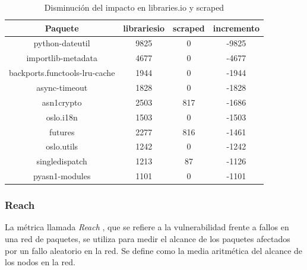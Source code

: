 \begin{table}[h!]
    \centering
    \label{tab:Disminución del impacto en libraries.io y scraped}
    \begin{tabular}{|c|c|c|c|}
        \hline
        \textbf{Paquete}              & \textbf{librariesio} & \textbf{scraped} & \textbf{incremento} \\
        \hline
        python-dateutil               & 9825                 & 0                & -9825               \\
        importlib-metadata            & 4677                 & 0                & -4677               \\
        backports.functools-lru-cache & 1944                 & 0                & -1944               \\
        async-timeout                 & 1828                 & 0                & -1828               \\
        asn1crypto                    & 2503                 & 817              & -1686               \\
        oslo.i18n                     & 1503                 & 0                & -1503               \\
        futures                       & 2277                 & 816              & -1461               \\
        oslo.utils                    & 1242                 & 0                & -1242               \\
        singledispatch                & 1213                 & 87               & -1126               \\
        pyasn1-modules                & 1101                 & 0                & -1101               \\
        \hline
    \end{tabular}
    \caption{Disminución del impacto en libraries.io y scraped}
\end{table}




\subsubsection{Reach}

La métrica llamada \emph{Reach} , que se refiere a la vulnerabilidad
frente a fallos en una red de paquetes, se utiliza para medir el alcance de los paquetes afectados
por un fallo aleatorio en la red. Se define como la media aritmética del alcance de los nodos
en la red.


